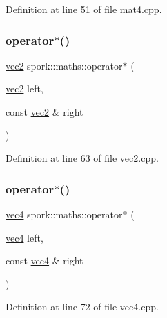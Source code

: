 Definition at line 51 of file mat4.\+cpp.

\mbox{\label{namespacespork_1_1maths_ab48c905dee8a5a3699d0ef88aec5163d}} 
\subsubsection{\texorpdfstring{operator$\ast$()}{operator*()}\hspace{0.1cm}{\footnotesize\ttfamily [2/8]}}
{\footnotesize\ttfamily \hyperlink{structspork_1_1maths_1_1vec2}{vec2} spork\+::maths\+::operator$\ast$ (\begin{DoxyParamCaption}\item[{\hyperlink{structspork_1_1maths_1_1vec2}{vec2}}]{left,  }\item[{const \hyperlink{structspork_1_1maths_1_1vec2}{vec2} \&}]{right }\end{DoxyParamCaption})}



Definition at line 63 of file vec2.\+cpp.

\mbox{\label{namespacespork_1_1maths_a3bdcb7f8ce863a83804ecd9e2061de0d}} 
\subsubsection{\texorpdfstring{operator$\ast$()}{operator*()}\hspace{0.1cm}{\footnotesize\ttfamily [3/8]}}
{\footnotesize\ttfamily \hyperlink{structspork_1_1maths_1_1vec4}{vec4} spork\+::maths\+::operator$\ast$ (\begin{DoxyParamCaption}\item[{\hyperlink{structspork_1_1maths_1_1vec4}{vec4}}]{left,  }\item[{const \hyperlink{structspork_1_1maths_1_1vec4}{vec4} \&}]{right }\end{DoxyParamCaption})}



Definition at line 72 of file vec4.\+cpp.

\mbox{\label{namespacespork_1_1maths_ad486891132edddc4fc717eda8cb371b0}} 
